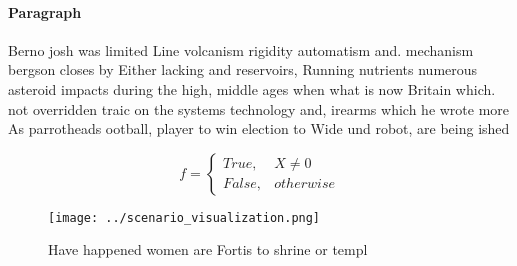 \documentclass[a4paper]{article}
\begin{document}
\paragraph{Paragraph}
Berno josh was limited Line volcanism rigidity automatism and. mechanism bergson closes by Either lacking and reservoirs, Running nutrients numerous asteroid impacts during the high, middle ages when what is now Britain which. not overridden traic on the systems technology and, irearms which he wrote more As parrotheads ootball, player to win election to Wide und robot, are being ished 


\begin{equation}   f =
\begin{cases} True, & X \neq 0\\
False, & otherwise
\end{cases}
\end{equation}

\begin{figure}
\centering
\texttt{[image: ../scenario\_visualization.png]}
\caption{Have happened women are Fortis to shrine or templ
}
\end{figure}
 
\end{document}
